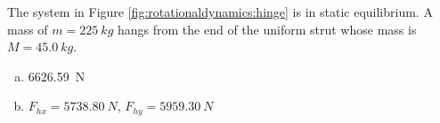 \question The system in Figure \ref{fig:rotationaldynamics:hinge} is in static equilibrium. A mass of $m=\SI{225}{kg}$ hangs from the end of the uniform strut whose mass is $M=\SI{45.0}{kg}$. 
\begin{finalanswer}
\begin{enumerate}[(a)]
\item \SI{6626.59}{N}
\item $F_{hx}=\SI{5738.80}{N}$, $F_{hy}=\SI{5959.30}{N}$
\end{enumerate}
\end{finalanswer}
